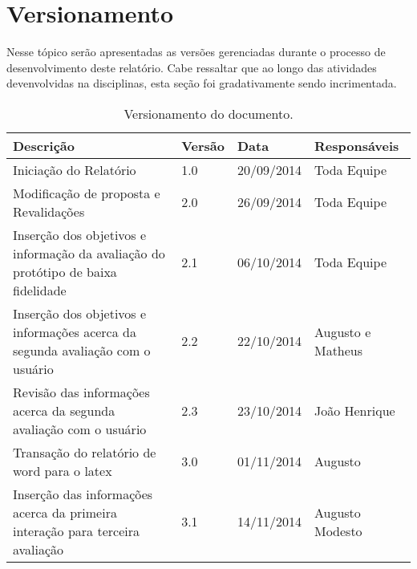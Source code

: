 \chapter[Versionamento]{Versionamento}
\label{chap:versionamento}
	Nesse tópico serão apresentadas as versões gerenciadas durante o processo de desenvolvimento deste relatório. Cabe ressaltar que ao longo das atividades devenvolvidas na disciplinas, esta seção foi gradativamente sendo incrimentada.
	
	\label{subsubsec:versionamento_talbe}
		\begin{table}[h]
			\centering
			\begin{tabular}{|p{5cm}|p{1.5cm}|p{2.5cm}|p{5cm}|}
				\hline
				
				Descrição & Versão & Data & Responsáveis \\ \hline
				
				Iniciação do Relatório & 1.0 & 20/09/2014 & Toda Equipe \\ \hline
				
				Modificação de proposta e Revalidações & 2.0 & 26/09/2014 & Toda Equipe \\ \hline
				
				Inserção dos objetivos e informação da avaliação do protótipo de baixa fidelidade & 2.1 & 06/10/2014 & Toda Equipe \\ \hline

				Inserção dos objetivos e informações acerca da segunda avaliação com o usuário & 2.2 & 22/10/2014 & Augusto e Matheus \\ \hline

				Revisão das informações acerca da segunda avaliação com o usuário & 2.3 & 23/10/2014 & João Henrique \\ \hline

				Transação do relatório de word para o latex & 3.0 & 01/11/2014 & Augusto \\ \hline

				Inserção das informações acerca da primeira interação para terceira avaliação & 3.1 & 14/11/2014 & Augusto Modesto \\ \hline

			\end{tabular}
			\caption[Versionamento do Documento]{Versionamento do documento.}
			\label{tab:versionamento_tabl}
		\end{table}

